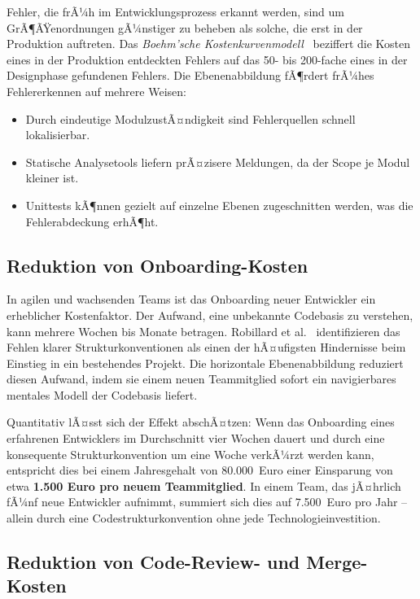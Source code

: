 ﻿\documentclass[a4paper,12pt]{article}
\begin{document}
Fehler, die frÃ¼h im Entwicklungsprozess erkannt werden, sind um GrÃ¶ÃŸenordnungen
gÃ¼nstiger zu beheben als solche, die erst in der Produktion auftreten. Das
\textit{Boehm'sche Kostenkurvenmodell}~\cite{boehm1981} beziffert die Kosten
eines in der Produktion entdeckten Fehlers auf das 50- bis 200-fache eines
in der Designphase gefundenen Fehlers. Die Ebenenabbildung fÃ¶rdert frÃ¼hes
Fehlererkennen auf mehrere Weisen:

\begin{itemize}[leftmargin=*]
	\item Durch eindeutige ModulzustÃ¤ndigkeit sind Fehlerquellen schnell lokalisierbar.
	\item Statische Analysetools liefern prÃ¤zisere Meldungen, da der Scope je Modul
	kleiner ist.
	\item Unittests kÃ¶nnen gezielt auf einzelne Ebenen zugeschnitten werden, was die
	Fehlerabdeckung erhÃ¶ht.
\end{itemize}

\subsection{Reduktion von Onboarding-Kosten}

In agilen und wachsenden Teams ist das Onboarding neuer Entwickler ein
erheblicher Kostenfaktor. Der Aufwand, eine unbekannte Codebasis zu verstehen,
kann mehrere Wochen bis Monate betragen. Robillard et al.~\cite{robillard2011}
identifizieren das Fehlen klarer Strukturkonventionen als einen der hÃ¤ufigsten
Hindernisse beim Einstieg in ein bestehendes Projekt. Die horizontale
Ebenenabbildung reduziert diesen Aufwand, indem sie einem neuen Teammitglied
sofort ein navigierbares mentales Modell der Codebasis liefert.

Quantitativ lÃ¤sst sich der Effekt abschÃ¤tzen: Wenn das Onboarding eines
erfahrenen Entwicklers im Durchschnitt vier Wochen dauert und durch eine
konsequente Strukturkonvention um eine Woche verkÃ¼rzt werden kann, entspricht
dies bei einem Jahresgehalt von 80.000~Euro einer Einsparung von etwa
\textbf{1.500 Euro pro neuem Teammitglied}. In einem Team, das jÃ¤hrlich fÃ¼nf
neue Entwickler aufnimmt, summiert sich dies auf 7.500~Euro pro Jahr -- allein
durch eine Codestrukturkonvention ohne jede Technologieinvestition.

\subsection{Reduktion von Code-Review- und Merge-Kosten}
\end{document}
